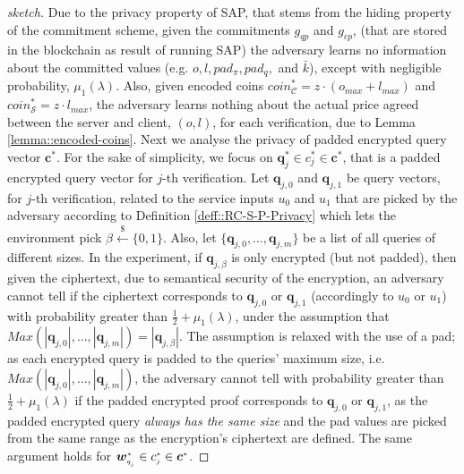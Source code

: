 \begin{proof}[sketch]
Due to the privacy property of SAP, that stems from the  hiding property of the commitment scheme, given the commitments $g_{\scriptscriptstyle qp}$ and $g_{\scriptscriptstyle cp}$, (that are stored in the blockchain as result of running SAP) the adversary learns no information about the committed values (e.g. $o, l, pad_{\scriptscriptstyle\pi}, pad_{\scriptscriptstyle q},$ and $\bar{k}$), except with negligible probability, $\mu_{\scriptscriptstyle 1}(\lambda)$.   Also, given encoded coins $coin^{\scriptscriptstyle *}_{\scriptscriptstyle\mathcal{C}}=z\cdot (o_{\scriptscriptstyle max}+l_{\scriptscriptstyle max})$ and  $coin^{\scriptscriptstyle *}_{\scriptscriptstyle\mathcal{S}}=z\cdot l_{\scriptscriptstyle max}$, the adversary learns nothing about the actual price agreed between the server and client,  $(o,l)$, for each verification, due to Lemma \ref{lemma::encoded-coins}. Next we analyse the privacy of padded encrypted query vector $\bm{c}^{\scriptscriptstyle *}$. For  the sake of simplicity, we focus on   $\bm{q}^{\scriptscriptstyle *}_{\scriptscriptstyle j}\in c^{\scriptscriptstyle *}_{\scriptscriptstyle j}\in\bm{c}^{\scriptscriptstyle *}$, that is a padded encrypted query vector for $j$-th verification. Let $\bm{q}_{\scriptscriptstyle j,0}$ and $\bm{q}_{\scriptscriptstyle j,1}$  be query vectors, for $j$-th verification, related to the service inputs $u_{\scriptscriptstyle 0}$ and $u_{\scriptscriptstyle 1}$ that    are picked by the adversary according to  Definition  \ref{deff::RC-S-P-Privacy} which lets  the environment pick $\beta\stackrel{\scriptscriptstyle\$}\leftarrow \{0,1\}$. Also, let $\{\bm{q}_{\scriptscriptstyle j,0},...,\bm{q}_{\scriptscriptstyle j,m}\}$ be a  list of all queries of different sizes. In the experiment, if $\bm{q}_{\scriptscriptstyle j,\beta}$  is only   encrypted (but not padded), then given the ciphertext, due to semantical security of the encryption, an adversary cannot tell if the ciphertext corresponds to $\bm{q}_{\scriptscriptstyle j,0}$ or $\bm{q}_{\scriptscriptstyle j,1}$  (accordingly to $u_{\scriptscriptstyle 0}$ or $u_{\scriptscriptstyle 1}$) with probability greater than $\frac{1}{2}+\mu_{\scriptscriptstyle 1}(\lambda)$,  under the assumption  that $Max(|\bm{q}_{\scriptscriptstyle j,0}|,...,|\bm{q}_{\scriptscriptstyle j,m}|)=|\bm{q}_{\scriptscriptstyle j,\beta}|$. The  assumption is  relaxed with the use of a pad; as each encrypted query is padded  to the queries' maximum size, i.e. $Max(|\bm{q}_{\scriptscriptstyle j,0}|,...,|\bm{q}_{\scriptscriptstyle j,m}|)$, the adversary cannot tell with probability greater than $\frac{1}{2}+\mu_{\scriptscriptstyle 1}(\lambda)$ if the  padded encrypted proof corresponds to  $\bm{q}_{\scriptscriptstyle j,0}$ or $\bm{q}_{\scriptscriptstyle j,1}$, as the padded encrypted query \emph{always has the same size} and the pad values are picked from the same range as the encryption's ciphertext are defined. The same argument holds for $\bm{w}^{\scriptscriptstyle *}_{\scriptscriptstyle q_{_{\scaleto{j}{\size}}}}\in c^{\scriptscriptstyle *}_{\scriptscriptstyle j}\in\bm{c}^{\scriptscriptstyle *}$. 


\end{proof}
